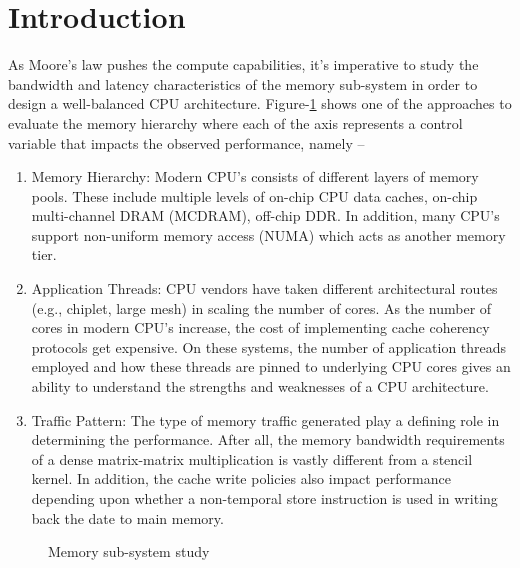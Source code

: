 \documentclass{article}
\begin{document}
\newpage


\section{Introduction}
As Moore's law pushes the compute capabilities, it's imperative to study the bandwidth and latency characteristics of the memory sub-system in order to design a well-balanced CPU architecture. Figure-\ref{figure:1} shows one of the approaches to evaluate the memory hierarchy where each of the axis represents a control variable that impacts the observed performance, namely --
\begin{enumerate}
    \item Memory Hierarchy: Modern CPU's consists of different layers of memory pools. These include multiple levels of on-chip CPU data caches, on-chip multi-channel DRAM (MCDRAM), off-chip DDR. In addition, many CPU's support non-uniform memory access (NUMA) which acts as another memory tier.
    \item Application Threads: CPU vendors have taken different architectural routes (e.g., chiplet, large mesh) in scaling the number of cores. As the number of cores in modern CPU's increase, the cost of implementing cache coherency protocols get expensive. On these systems, the number of application threads employed and how these threads are pinned to underlying CPU cores gives an ability to understand the strengths and weaknesses of a CPU architecture.
    \item Traffic Pattern: The type of memory traffic generated play a defining role in determining the performance. After all, the memory bandwidth requirements of a dense matrix-matrix multiplication is vastly different from a stencil kernel. In addition, the cache write policies also impact performance depending upon whether a non-temporal store instruction is used in writing back the date to main memory.
\end{enumerate}

\begin{figure}
\centering
{}
\caption{Memory sub-system study} \label{figure:1}
\end{figure}
\end{document}
